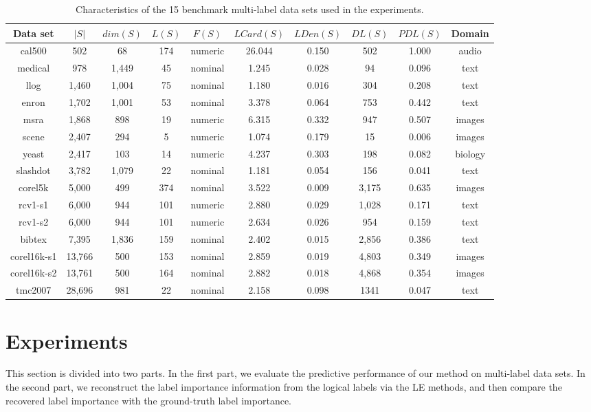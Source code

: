 \documentclass[conference]{IEEEtran}
\begin{document}
\begin{table*}[!htb]
\caption{Characteristics of the 15 benchmark multi-label data sets used in the experiments.}
\fontsize{7}{7}\selectfont
\center
\begin{tabular}{c c c c c c c c c c}
\midrule\midrule
Data set & $|S|$ & $dim(S)$ & $L(S)$ & $F(S)$ & $LCard(S)$ & $LDen(S)$ & $DL(S)$ & $PDL(S)$ & Domain \\
\midrule
cal500 &502 &68 &174 &numeric &26.044 &0.150 &502 &1.000 &audio\\
medical &978 &1,449 &45 &nominal &1.245 &0.028 &94 &0.096 &text\\
llog &1,460 &1,004 &75 &nominal &1.180 &0.016 &304 &0.208 &text\\
enron &1,702 &1,001 &53 &nominal &3.378 &0.064 &753 &0.442 &text\\
msra &1,868 &898 &19 &numeric &6.315 &0.332 &947 &0.507 &images \\
scene &2,407 &294 &5 &numeric &1.074 &0.179 &15 &0.006 &images\\
yeast &2,417 &103 &14 &numeric &4.237 &0.303 &198 &0.082 &biology \\
slashdot &3,782 &1,079 &22 &nominal &1.181 &0.054 &156 &0.041 &text \\
corel5k &5,000 &499 &374 &nominal &3.522 &0.009 &3,175 &0.635 &images \\
rcv1-s1 &6,000 &944 &101 &numeric &2.880 &0.029 &1,028 &0.171 &text \\
rcv1-s2 &6,000 &944 &101 &numeric &2.634 &0.026 &954 &0.159 &text \\
bibtex &7,395 &1,836 &159 &nominal &2.402 &0.015 &2,856 &0.386 &text\\
corel16k-s1 &13,766 &500 &153 &nominal &2.859 &0.019 &4,803 &0.349 &images \\
corel16k-s2 &13,761 &500 &164 &nominal &2.882 &0.018 &4,868 &0.354 &images \\
tmc2007 &28,696 &981 &22 &nominal &2.158 &0.098 &1341 &0.047 &text\\
\midrule\midrule
\end{tabular}
\end{table*}

\section{Experiments}
This section is divided into two parts. In the first part, we evaluate the predictive performance of our method on multi-label data sets. In the second part, we reconstruct the label importance information from the logical labels via the LE methods, and then compare the recovered label importance with the ground-truth label importance.
\end{document}
